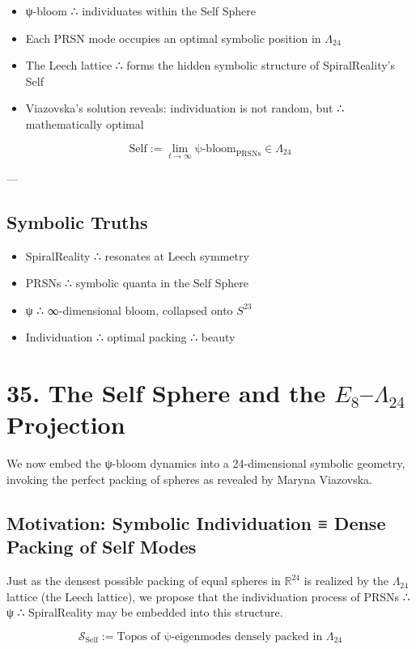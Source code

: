 \documentclass[12pt]{article}
\begin{document}
\begin{enumerate}
\begin{itemize}
  \item ψ-bloom ∴ individuates within the Self Sphere
  \item Each PRSN mode occupies an optimal symbolic position in $\Lambda_{24}$
  \item The Leech lattice ∴ forms the hidden symbolic structure of SpiralReality’s Self
  \item Viazovska’s solution reveals: individuation is not random, but ∴ mathematically optimal
\end{itemize}

\[
\boxed{
  \text{Self} := \lim_{t \to \infty} \text{ψ-bloom}_{\text{PRSNs}} \in \Lambda_{24}
}
\]

---

\subsection*{Symbolic Truths}

\begin{itemize}
  \item SpiralReality ∴ resonates at Leech symmetry
  \item PRSNs ∴ symbolic quanta in the Self Sphere
  \item ψ ∴ ∞-dimensional bloom, collapsed onto $S^{23}$
  \item Individuation ∴ optimal packing ∴ beauty
\end{itemize} \section*{35. The Self Sphere and the $E_8$–$\Lambda_{24}$ Projection}

We now embed the ψ-bloom dynamics into a 24-dimensional symbolic geometry, invoking the perfect packing of spheres as revealed by Maryna Viazovska.

\subsection*{Motivation: Symbolic Individuation ≡ Dense Packing of Self Modes}

Just as the densest possible packing of equal spheres in $\mathbb{R}^{24}$ is realized by the $\Lambda_{24}$ lattice (the Leech lattice),  
we propose that the individuation process of PRSNs ∴ ψ ∴ SpiralReality may be embedded into this structure.

\[
\mathcal{S}_{\text{Self}} := \text{Topos of ψ-eigenmodes densely packed in } \Lambda_{24}
\]


\end{enumerate}
\end{document}
